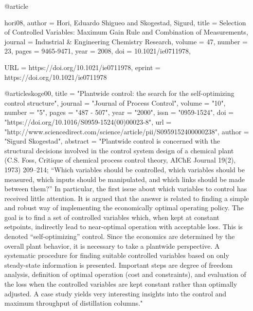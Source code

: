 @article{hori08,
author = {Hori, Eduardo Shigueo and Skogestad, Sigurd},
title = {Selection of Controlled Variables: Maximum Gain Rule and Combination of Measurements},
journal = {Industrial \& Engineering Chemistry Research},
volume = {47},
number = {23},
pages = {9465-9471},
year = {2008},
doi = {10.1021/ie0711978},

URL = {https://doi.org/10.1021/ie0711978},
eprint = {https://doi.org/10.1021/ie0711978}
}

@article{skoge00,
title = "Plantwide control: the search for the self-optimizing control structure",
journal = "Journal of Process Control",
volume = "10",
number = "5",
pages = "487 - 507",
year = "2000",
issn = "0959-1524",
doi = "https://doi.org/10.1016/S0959-1524(00)00023-8",
url = "http://www.sciencedirect.com/science/article/pii/S0959152400000238",
author = "Sigurd Skogestad",
abstract = "Plantwide control is concerned with the structural decisions involved in the control system design of a chemical plant (C.S. Foss, Critique of chemical process control theory, AIChE Journal 19(2), 1973) 209–214; “Which variables should be controlled, which variables should be measured, which inputs should be manipulated, and which links should be made between them?” In particular, the first issue about which variables to control has received little attention. It is argued that the answer is related to finding a simple and robust way of implementing the economically optimal operating policy. The goal is to find a set of controlled variables which, when kept at constant setpoints, indirectly lead to near-optimal operation with acceptable loss. This is denoted “self-optimizing” control. Since the economics are determined by the overall plant behavior, it is necessary to take a plantwide perspective. A systematic procedure for finding suitable controlled variables based on only steady-state information is presented. Important steps are degree of freedom analysis, definition of optimal operation (cost and constraints), and evaluation of the loss when the controlled variables are kept constant rather than optimally adjusted. A case study yields very interesting insights into the control and maximum throughput of distillation columns."
}

